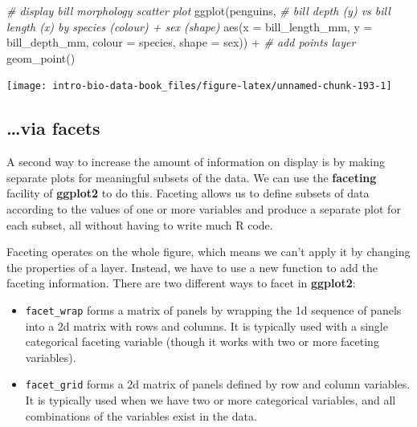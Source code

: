 \documentclass[
]{book}
\newenvironment{Shaded}{\begin{snugshade}}{\end{snugshade}}
\newcommand{\AttributeTok}[1]{\textcolor[rgb]{0.77,0.63,0.00}{#1}}
\newcommand{\CommentTok}[1]{\textcolor[rgb]{0.56,0.35,0.01}{\textit{#1}}}
\newcommand{\FunctionTok}[1]{\textcolor[rgb]{0.00,0.00,0.00}{#1}}
\newcommand{\NormalTok}[1]{#1}
\newcommand{\SpecialCharTok}[1]{\textcolor[rgb]{0.00,0.00,0.00}{#1}}
\providecommand{\tightlist}{%
  \setlength{\itemsep}{0pt}\setlength{\parskip}{0pt}}
\begin{document}
\begin{Shaded}
\begin{Highlighting}[]
\CommentTok{\# display bill morphology scatter plot}
\FunctionTok{ggplot}\NormalTok{(penguins, }
       \CommentTok{\# bill depth (y) vs bill length (x) by species (colour) + sex (shape)}
       \FunctionTok{aes}\NormalTok{(}\AttributeTok{x =}\NormalTok{ bill\_length\_mm, }\AttributeTok{y =}\NormalTok{ bill\_depth\_mm, }\AttributeTok{colour =}\NormalTok{ species, }\AttributeTok{shape =}\NormalTok{ sex)) }\SpecialCharTok{+} 
  \CommentTok{\# add points layer}
  \FunctionTok{geom\_point}\NormalTok{()}
\end{Highlighting}
\end{Shaded}

\begin{center}\texttt{[image: intro-bio-data-book\_files/figure-latex/unnamed-chunk-193-1]} \end{center}

\hypertarget{via-facets}{%
\subsection{\ldots via facets}\label{via-facets}}

A second way to increase the amount of information on display is by making separate plots for meaningful subsets of the data. We can use the \textbf{faceting} facility of \textbf{ggplot2} to do this. Faceting allows us to define subsets of data according to the values of one or more variables and produce a separate plot for each subset, all without having to write much R code.

Faceting operates on the whole figure, which means we can't apply it by changing the properties of a layer. Instead, we have to use a new function to add the faceting information. There are two different ways to facet in \textbf{ggplot2}:

\begin{itemize}
\tightlist
\item
  \texttt{facet\_wrap} forms a matrix of panels by wrapping the 1d sequence of panels into a 2d matrix with rows and columns. It is typically used with a single categorical faceting variable (though it works with two or more faceting variables).
\item
  \texttt{facet\_grid} forms a 2d matrix of panels defined by row and column variables. It is typically used when we have two or more categorical variables, and all combinations of the variables exist in the data.
\end{itemize}
\end{document}
